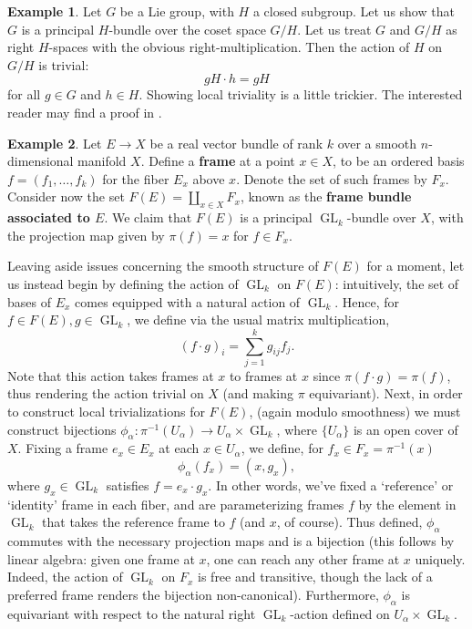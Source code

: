 \documentclass{book}
\DeclareMathOperator{\GL}{GL}
\theoremstyle{plain}
\theoremstyle{definition}
\newtheorem{exmp}{Example}
\theoremstyle{remark}
\begin{document}
\begin{exmp}
    Let $G$ be a Lie group, with $H$ a closed subgroup. Let us show that $G$ is a principal $H$-bundle over the coset space $G/H$.
    Let us treat $G$ and $G/H$ as right $H$-spaces with the obvious right-multiplication. Then the action of $H$ on $G/H$ is trivial:
    \[gH\cdot h = gH\]
    for all $g\in G$ and $h\in H$. Showing local triviality is a little trickier. The interested reader may find a proof in .
\end{exmp}

\begin{exmp}
    Let $E\to X$ be a real vector bundle of rank $k$ over a smooth $n$-dimensional manifold $X$.
    Define a \textbf{frame} at a point $x\in X$, to be an ordered basis $f=(f_1,\ldots, f_k)$ for the fiber $E_x$ above $x$. Denote the set of such frames by $F_x$.
    Consider now the set $F(E)=\coprod_{x\in X} F_x$, known as the \textbf{frame bundle associated to $E$}. We claim that $F(E)$ is a principal
    $\GL_k$-bundle over $X$, with the projection map given by $\pi(f)=x$ for $f\in F_x$.

    Leaving aside issues concerning the smooth structure of $F(E)$ for a moment, let us instead begin by defining the action of $\GL_k$ on $F(E)$:
    intuitively, the set of bases of $E_x$ comes equipped with a natural action of $\GL_k$.
    Hence, for $f\in F(E), g\in\GL_k$, we define via the usual matrix multiplication,
    \[(f\cdot g)_i=\sum_{j=1}^kg_{ij}f_j.\]
    Note that this action takes
    frames at $x$ to frames at $x$ since $\pi(f\cdot g)=\pi(f)$, thus rendering the action trivial on $X$ (and making $\pi$ equivariant). Next, in order to construct
    local trivializations for $F(E)$, (again modulo smoothness) we must construct bijections $\phi_\alpha:\pi^{-1}(U_\alpha)\to U_\alpha\times\GL_k$,
    where $\{U_\alpha\}$ is an open cover of $X$. Fixing a frame $e_x\in E_x$ at each $x\in U_\alpha$, we define, for $f_x\in F_x=\pi^{-1}(x)$
    \[\phi_\alpha(f_x)=(x, g_x),\]
    where $g_x\in\GL_k$ satisfies $f=e_x\cdot g_x$. In other words, we've fixed a `reference' or `identity' frame in each fiber, and are parameterizing
    frames $f$ by the element in $\GL_k$ that takes the reference frame to $f$ (and $x$, of course). Thus defined, $\phi_\alpha$ commutes with the
    necessary projection maps and is a bijection (this follows by linear algebra: given one frame at $x$, one can reach any other frame at $x$ uniquely. Indeed,
    the action of $\GL_k$ on $F_x$ is free and transitive, though the lack of a preferred frame renders the bijection non-canonical).
    Furthermore, $\phi_\alpha$ is equivariant with respect to the natural right $\GL_k$-action defined on $U_\alpha\times\GL_k$.


\end{exmp}
\end{document}
